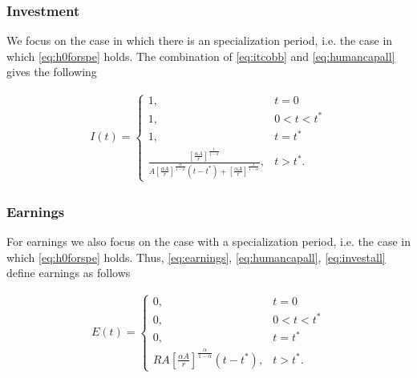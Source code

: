 \subsubsection{Investment}
We focus on the case in which there is an specialization period, i.e. the case in which \eqref{eq:h0forspe} holds. The combination of \eqref{eq:itcobb} and \eqref{eq:humancapall} gives the following

\begin{eqnarray}
I(t) =
\begin{cases}
1, & t = 0 \\
1, & 0 < t < t^* \\
1, & t = t^* \\
\frac{\left[ \frac{\alpha A}{r} \right]^{\frac{1}{1 - \alpha}}}{A \left[ \frac{\alpha A}{r} \right]^{\frac{ \alpha }{1 - \alpha}} \left( t - t^* \right) + \left[ \frac{\alpha A}{r} \right]^{\frac{1}{1 - \alpha}}}, & t > t^*. \label{eq:investall}
\end{cases}
\end{eqnarray}

\subsubsection{Earnings}
For earnings we also focus on the case with a specialization period, i.e. the case in which \eqref{eq:h0forspe} holds. Thus, \eqref{eq:earnings}, \eqref{eq:humancapall}, \eqref{eq:investall} define earnings as follows

\begin{eqnarray}
E(t) =
\begin{cases}
0, & t = 0 \\
0, & 0 < t < t^* \\
0, & t = t^* \\
RA \left[ \frac{\alpha A}{r} \right]^{\frac{\alpha}{1 - \alpha}} \left( t - t^* \right) , & t > t^*. \label{eq:earnsall}
\end{cases}
\end{eqnarray}

